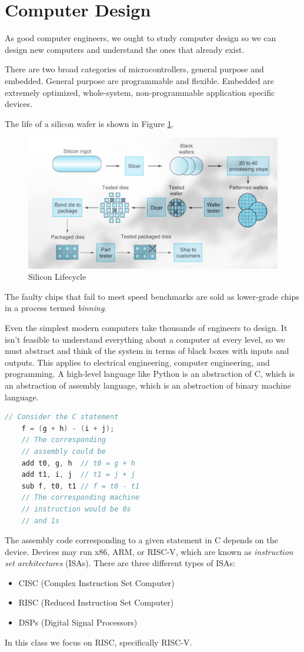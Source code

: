 \section{Computer Design}

As good computer engineers, we ought to study computer
design so we can design new computers and understand
the ones that already exist.

There are two broad categories of microcontrollers,
general purpose and embedded. General purpose are
programmable and flexible. Embedded are extremely
optimized, whole-system, non-programmable application
specific devices.

The life of a silicon wafer is shown in Figure
\ref{fig:silicon}.
\begin{figure}
    \includegraphics{images/silicon.png}
    \caption{Silicon Lifecycle}
    \label{fig:silicon}
\end{figure}
The faulty chips that fail to meet speed benchmarks
are sold as lower-grade chips in a process termed
\emph{binning}.

Even the simplest modern computers take thousands
of engineers to design. It isn't feasible to
understand everything about a computer at every
level, so we must abstract and think of the system
in terms of black boxes with inputs and outputs. This
applies to electrical engineering, computer engineering,
and programming. A high-level language like Python is
an abstraction of C, which is an abstraction of assembly
language, which is an abstraction of binary machine language.
\begin{lstlisting}[language=C]
    // Consider the C statement
    f = (g + h) - (i + j);
    // The corresponding 
    // assembly could be
    add t0, g, h  // t0 = g + h
    add t1, i, j  // t1 = j + j
    sub f, t0, t1 // f = t0 - t1
    // The corresponding machine 
    // instruction would be 0s 
    // and 1s
\end{lstlisting}
The assembly code corresponding to a given statement in
C depends on the device. Devices may run x86, ARM, or RISC-V,
which are known as \emph{instruction set architectures} (ISAs).
There are three different types of ISAs:
\begin{itemize}
    \item CISC (Complex Instruction Set Computer)
    \item RISC (Reduced Instruction Set Computer)
    \item DSPs (Digital Signal Processors)
\end{itemize}
In this class we focus on RISC, specifically RISC-V.

